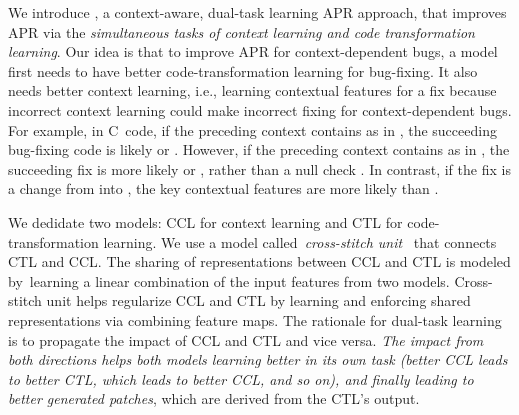 We introduce {\tool}, a context-aware, dual-task learning APR
approach, that improves APR via the {\em simultaneous tasks of context
  learning and code transformation learning}. Our idea is that to
improve APR for context-dependent bugs, a model first needs to
have better code-transformation learning for bug-fixing. It also
needs better context learning, i.e., learning contextual features
for a fix because incorrect context learning could make incorrect
fixing for context-dependent bugs.
For example, in C~code, if the preceding context contains 
as in , the succeeding
bug-fixing code is likely  \code{!=}  or
 \code{==} . However, if the preceding
context contains  as in  \code{=}
, the succeeding fix is more likely
 \code{!=}  or  \code{==}
, rather than a null check  \code{!=}
. In contrast, if the fix is a change from 
\code{==}  into  \code{!=} , the
key contextual features are more likely  than
.

We dedidate two models: CCL for context learning and CTL for
code-transformation learning. We use a model called~{\em cross-stitch
  unit}~\cite{misra2016cross} that connects CTL and CCL. The sharing
of representations between CCL and CTL is modeled by~learning a linear
combination of the input features from two models. Cross-stitch unit
helps regularize CCL and CTL by learning and enforcing shared
representations via combining feature maps. The rationale for
dual-task learning is to propagate the impact of CCL and CTL and vice
versa. {\em The impact from both directions helps both models learning
  better in its own task (better CCL leads to better CTL, which leads
  to better CCL, and so on), and finally leading to better generated
  patches}, which are derived from the CTL's output.


